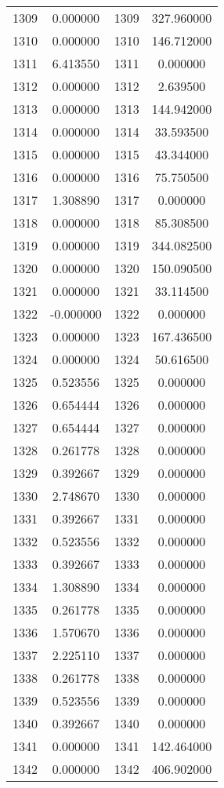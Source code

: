 \documentclass[12pt]{article}
\begin{document}
\begin{longtable}{@{}cccc@{}}
1309 & 0.000000 & 1309 & 327.960000 \\
1310 & 0.000000 & 1310 & 146.712000 \\
1311 & 6.413550 & 1311 & 0.000000 \\
1312 & 0.000000 & 1312 & 2.639500 \\
1313 & 0.000000 & 1313 & 144.942000 \\
1314 & 0.000000 & 1314 & 33.593500 \\
1315 & 0.000000 & 1315 & 43.344000 \\
1316 & 0.000000 & 1316 & 75.750500 \\
1317 & 1.308890 & 1317 & 0.000000 \\
1318 & 0.000000 & 1318 & 85.308500 \\
1319 & 0.000000 & 1319 & 344.082500 \\
1320 & 0.000000 & 1320 & 150.090500 \\
1321 & 0.000000 & 1321 & 33.114500 \\
1322 & -0.000000 & 1322 & 0.000000 \\
1323 & 0.000000 & 1323 & 167.436500 \\
1324 & 0.000000 & 1324 & 50.616500 \\
1325 & 0.523556 & 1325 & 0.000000 \\
1326 & 0.654444 & 1326 & 0.000000 \\
1327 & 0.654444 & 1327 & 0.000000 \\
1328 & 0.261778 & 1328 & 0.000000 \\
1329 & 0.392667 & 1329 & 0.000000 \\
1330 & 2.748670 & 1330 & 0.000000 \\
1331 & 0.392667 & 1331 & 0.000000 \\
1332 & 0.523556 & 1332 & 0.000000 \\
1333 & 0.392667 & 1333 & 0.000000 \\
1334 & 1.308890 & 1334 & 0.000000 \\
1335 & 0.261778 & 1335 & 0.000000 \\
1336 & 1.570670 & 1336 & 0.000000 \\
1337 & 2.225110 & 1337 & 0.000000 \\
1338 & 0.261778 & 1338 & 0.000000 \\
1339 & 0.523556 & 1339 & 0.000000 \\
1340 & 0.392667 & 1340 & 0.000000 \\
1341 & 0.000000 & 1341 & 142.464000 \\
1342 & 0.000000 & 1342 & 406.902000 \\

\end{longtable}
\end{document}
